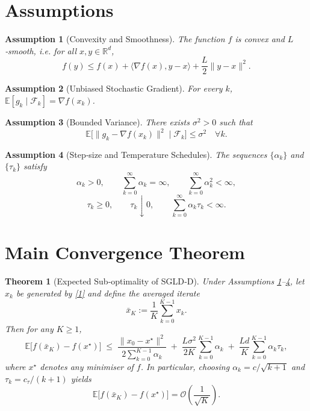 \documentclass{article}
\newtheorem{theorem}{Theorem}
\newtheorem{assumption}{Assumption}
\newcommand{\E}{\mathbb{E}}
\newcommand{\R}{\mathbb{R}}
\begin{document}
\newpage
\section*{Assumptions}
\begin{assumption}[Convexity and Smoothness]\label{ass:convex}
The function $f$ is convex and $L$‑smooth, i.e. for all $x,y\in\R^{d}$,
\[
f(y)\le f(x)+\langle\nabla f(x),y-x\rangle+\frac{L}{2}\|y-x\|^{2}.
\]
\end{assumption}

\begin{assumption}[Unbiased Stochastic Gradient]\label{ass:unbiased}
For every $k$, $\E[g_{k}\mid\mathcal F_{k}]=\nabla f(x_{k})$.
\end{assumption}

\begin{assumption}[Bounded Variance]\label{ass:variance}
There exists $\sigma^{2}>0$ such that
\[
\E\big[\|g_{k}-\nabla f(x_{k})\|^{2}\mid\mathcal F_{k}\big]\le\sigma^{2}\quad\forall k.
\]
\end{assumption}

\begin{assumption}[Step‑size and Temperature Schedules]\label{ass:schedules}
The sequences $\{\alpha_{k}\}$ and $\{\tau_{k}\}$ satisfy
\[
\alpha_{k}>0,\qquad \sum_{k=0}^{\infty}\alpha_{k}= \infty,\qquad 
\sum_{k=0}^{\infty}\alpha_{k}^{2}<\infty,
\]
\[
\tau_{k}\ge0,\qquad \tau_{k}\downarrow0,\qquad 
\sum_{k=0}^{\infty}\alpha_{k}\tau_{k}<\infty .
\]
\end{assumption}

\section*{Main Convergence Theorem}
\begin{theorem}[Expected Sub‑optimality of SGLD‑D]\label{thm:main}
Under Assumptions \ref{ass:convex}–\ref{ass:schedules}, let $x_{k}$ be generated by \eqref{1} and define the averaged iterate
\[
\bar x_{K}:=\frac{1}{K}\sum_{k=0}^{K-1}x_{k}.
\]
Then for any $K\ge1$,
\[
\E\!\big[f(\bar x_{K})-f(x^{\star})\big]
\;\le\;
\frac{\|x_{0}-x^{\star}\|^{2}}{2\sum_{k=0}^{K-1}\alpha_{k}}
\;+\;
\frac{L\sigma^{2}}{2K}\sum_{k=0}^{K-1}\alpha_{k}
\;+\;
\frac{L d}{K}\sum_{k=0}^{K-1}\alpha_{k}\tau_{k},
\tag{2}
\]
where $x^{\star}$ denotes any minimiser of $f$.
In particular, choosing $\alpha_{k}=c/\sqrt{k+1}$ and $\tau_{k}=c_{\tau}/(k+1)$ yields
\[
\E\!\big[f(\bar x_{K})-f(x^{\star})\big]=\mathcal O\!\left(\frac{1}{\sqrt{K}}\right).
\]
\end{theorem}
\end{document}
